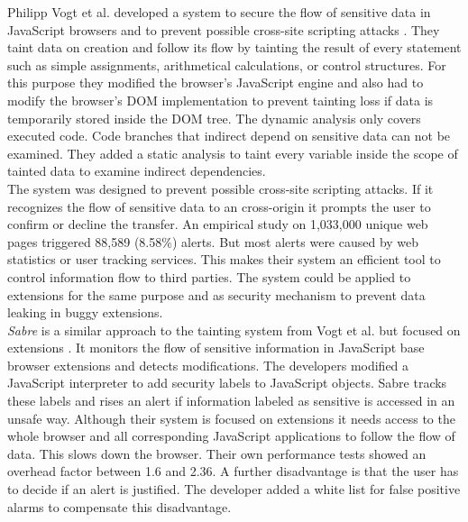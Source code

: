 	Philipp Vogt et al. developed a system to secure the flow of sensitive data in JavaScript browsers and to prevent possible cross-site scripting attacks \cite{ndss2007xss} . They taint data on creation and follow its flow by tainting the result of every statement such as simple assignments, arithmetical calculations, or control structures. For this purpose they modified the browser's JavaScript engine and also had to modify the browser's DOM implementation to prevent tainting loss if data is temporarily stored inside the DOM tree. The dynamic analysis only covers executed code. Code branches that indirect depend on sensitive data can not be examined. They added a static analysis to taint every variable inside the scope of tainted data to examine indirect dependencies. \\
	The system was designed to prevent possible cross-site scripting attacks. If it recognizes the flow of sensitive data to an cross-origin it prompts the user to confirm or decline the transfer. An empirical study on 1,033,000 unique web pages triggered 88,589 (8.58\%) alerts. But most alerts were caused by web statistics or user tracking services. This makes their system an efficient tool to control information flow to third parties. The system could be applied to extensions for the same purpose and as security mechanism to prevent data leaking in buggy extensions. \\
	
	\textit{Sabre} is a similar approach to the tainting system from Vogt et al. but focused on extensions \cite{Dhawan:2009:AIF:1723192.1723250, ndss2007xss}. It monitors the flow of sensitive information in JavaScript base browser extensions and detects modifications. The developers modified a JavaScript interpreter to add security labels to JavaScript objects. Sabre tracks these labels and rises an alert if information labeled as sensitive is accessed in an unsafe way. Although their system is focused on extensions it needs access to the whole browser and all corresponding JavaScript applications to follow the flow of data. This slows down the browser. Their own performance tests showed an overhead factor between 1.6 and 2.36. A further disadvantage is that the user has to decide if an alert is justified. The developer added a white list for false positive alarms to compensate this disadvantage. \\
